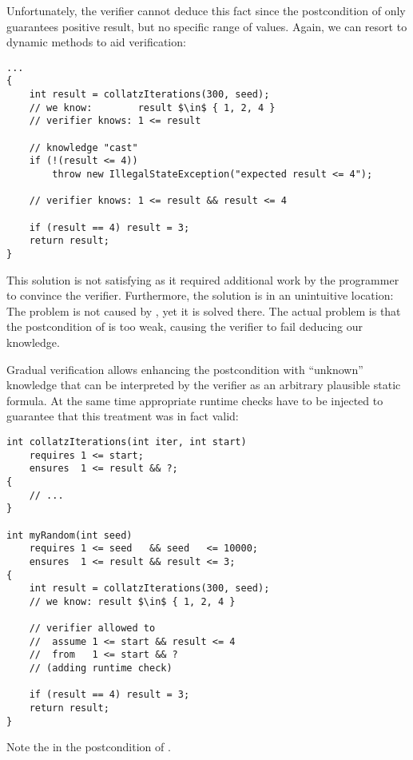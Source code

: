 Unfortunately, the verifier cannot deduce this fact since the postcondition of  only guarantees positive result, but no specific range of values.
Again, we can resort to dynamic methods to aid verification:

\begin{lstlisting}
...
{
    int result = collatzIterations(300, seed);
    // we know:        result $\in$ { 1, 2, 4 }
    // verifier knows: 1 <= result
    
    // knowledge "cast"
    if (!(result <= 4))
        throw new IllegalStateException("expected result <= 4");

    // verifier knows: 1 <= result && result <= 4 
    
    if (result == 4) result = 3;
    return result;
}
\end{lstlisting}

This solution is not satisfying as it required additional work by the programmer to convince the verifier.
Furthermore, the solution is in an unintuitive location:
The problem is not caused by , yet it is solved there.
The actual problem is that the postcondition of  is too weak, causing the verifier to fail deducing our knowledge.

Gradual verification allows enhancing the postcondition with “unknown” knowledge that can be interpreted by the verifier as an arbitrary plausible static formula.
At the same time appropriate runtime checks have to be injected to guarantee that this treatment was in fact valid:
\begin{lstlisting}
int collatzIterations(int iter, int start)
    requires 1 <= start;
    ensures  1 <= result && ?;
{
    // ...
}

int myRandom(int seed)
    requires 1 <= seed   && seed   <= 10000;
    ensures  1 <= result && result <= 3;
{
    int result = collatzIterations(300, seed);
    // we know: result $\in$ { 1, 2, 4 }
    
    // verifier allowed to
    //  assume 1 <= start && result <= 4
    //  from   1 <= start && ?
    // (adding runtime check)
    
    if (result == 4) result = 3;
    return result;
}
\end{lstlisting}
Note the  in the postcondition of .


